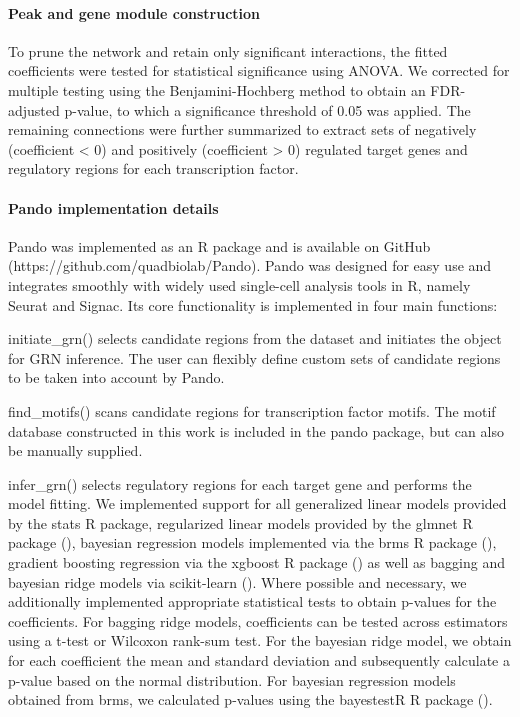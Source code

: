  
\paragraph{Peak and gene module construction}
To prune the network and retain only significant interactions, the fitted coefficients were tested for statistical significance using ANOVA. We corrected for multiple testing using the Benjamini-Hochberg method to obtain an FDR-adjusted p-value, to which a significance threshold of 0.05 was applied. The remaining connections were further summarized to extract sets of negatively (coefficient < 0) and positively (coefficient > 0) regulated target genes and regulatory regions for each transcription factor.
 
 
\paragraph{Pando implementation details}
Pando was implemented as an R package and is available on GitHub (https://github.com/quadbiolab/Pando). Pando was designed for easy use and integrates smoothly with widely used single-cell analysis tools in R, namely Seurat and Signac. Its core functionality is implemented in four main functions:

initiate\_grn() selects candidate regions from the dataset and initiates the object for GRN inference. The user can flexibly define custom sets of candidate regions to be taken into account by Pando.
 
find\_motifs() scans candidate regions for transcription factor motifs. The motif database constructed in this work is included in the pando package, but can also be manually supplied.
 
infer\_grn() selects regulatory regions for each target gene and performs the model fitting. We implemented support for all generalized linear models provided by the stats R package, regularized linear models provided by the glmnet R package (\cite{friedman_regularization_2010}), bayesian regression models implemented via the brms R package (\cite{burkner_brms_2017}), gradient boosting regression via the xgboost R package (\cite{chen_xgboost_2016}) as well as bagging and bayesian ridge models via scikit-learn (\cite{garreta_learning_2013}). Where possible and necessary, we additionally implemented appropriate statistical tests to obtain p-values for the coefficients. For bagging ridge models, coefficients can be tested across estimators using a t-test or Wilcoxon rank-sum test. For  the bayesian ridge model, we obtain for each coefficient the mean and standard deviation and subsequently calculate a p-value based on the normal distribution. For bayesian regression models obtained from brms, we calculated p-values using the bayestestR R package (\cite{makowski_bayestestr_2019}).
 
